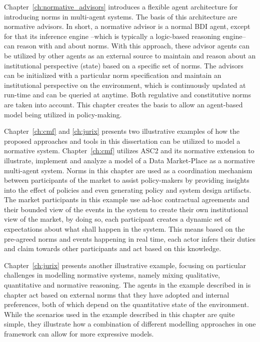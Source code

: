 Chapter~\ref{ch:normative_advisors} introduces a flexible agent architecture for introducing norms in multi-agent systems. The basis of this architecture are normative advisors. In short, a normative advisor is a normal BDI agent, except for that its inference engine --which is typically a logic-based reasoning engine-- can reason with and about norms. With this approach, these advisor agents can be utilized by other agents as an external source to maintain and reason about an institutional perspective (state) based on a specific set of norms. The advisors can be initialized with a particular norm specification and maintain an institutional perspective on the environment, which is continuously updated at run-time and can be queried at anytime. Both regulative and constitutive norms are taken into account. This chapter creates the basis to allow an agent-based model being utilized in policy-making.


Chapter~\ref{ch:cmf} and \ref{ch:jurix} presents two illustrative examples of how the proposed approaches and tools in this dissertation can be utilized to model a normative system. Chapter~\ref{ch:cmf} utilizes ASC2 and its normative extension to illustrate, implement and analyze a model of a Data Market-Place as a normative multi-agent system. Norms in this chapter are used as a coordination mechanism between participants of the market to assist policy-makers by providing insights into the effect of policies and even generating policy and system design artifacts. The market participants in this example use ad-hoc contractual agreements and their bounded view of the events in the system to create their own institutional view of the market, by doing so, each participant creates a dynamic set of expectations about what shall happen in the system. This means based on the pre-agreed norms and events happening in real time, each actor infers their duties and claim towards other participants and act based on this knowledge. 

Chapter~\ref{ch:jurix} presents another illustrative example, focusing on particular challenges in modelling normative systems, namely mixing qualitative, quantitative and normative reasoning. The agents in the example described in is chapter act based on external norms that they have adopted and internal preferences, both of which depend on the quantitative state of the environment. While the scenarios used in the example described in this chapter are quite simple, they illustrate how a combination of different modelling approaches in one framework can allow for more expressive models.



